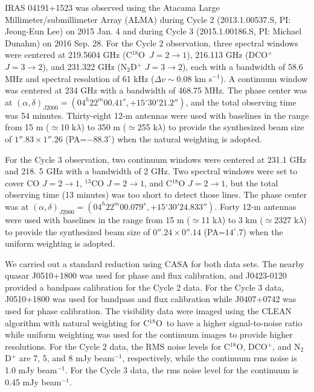 \documentclass{nature}
\newcommand{\jj}[2]{\mbox{$J = #1\rightarrow#2$}}
\newcommand{\cooo}{\mbox{C$^{18}$O}}
\newcommand{\degree}{\mbox{$^\circ$}}
\begin{document}


IRAS 04191+1523 was observed using the Atacama Large Millimeter/submillimeter Array (ALMA) 
during  Cycle 2  (2013.1.00537.S, PI: Jeong-Eun Lee) on 2015 Jan. 4 
and during Cycle 3 (2015.1.00186.S, PI: Michael Dunahm) on 2016 Sep. 28.
For the Cycle 2 observation, three spectral windows were centered  at 219.5604 GHz (\cooo\ \jj21), 
216.113 GHz (DCO$^+$ \jj32), and 231.322 GHz (N$_2$D$^+$ \jj32), 
each with a bandwidth of 58.6 MHz and spectral resolution of 61 kHz ($ \Delta v \sim$0.08 km s$^{-1}$). 
A continuum window was centered at  234 GHz with a bandwidth of 468.75 MHz.
The phase center was at $(\alpha, \delta)_{J2000}=(04^{h}22^{m}00.41^{s}, +15\degree30'21.2'')$, 
and the total observing time was 54 minutes. 
Thirty-eight 12-m antennas were used with baselines in the range from 15 m ($\simeq$10 k$\lambda$) 
to 350 m ($\simeq$255 k$\lambda$) to provide the synthesized beam size of $1''.83 \times 1''.26$ (PA=$-88.3^{\circ}$)
when the natural weighting is adopted.

For the Cycle 3 observation, two continuum windows were centered at 231.1 GHz and 218. 5 GHz with a bandwidth of 2 GHz.
Two spectral windows were set to cover CO \jj21, $^{13}$CO \jj21, and C$^{18}$O \jj21, 
but the total observing time (13 minutes) was too short to detect those lines.
The phase center was at $(\alpha, \delta)_{J2000}=(04^{h}22^{m}00.079^{s}, +15\degree30'24.833'')$.
Forty 12-m antennas were used with baselines in the range from 15 m ($\simeq$11 k$\lambda$) to 3 km ($\simeq$2327 k$\lambda$)
to provide the synthesized beam size of $0''.24 \times 0''.14$ (PA=$14^{\circ}.7$) when the uniform weighting is adopted.

We carried out a standard reduction using CASA\cite{McMullin2007} for both data sets.
The nearby quasar J0510+1800 was used for phase and flux calibration, and J0423-0120 provided a bandpass calibration 
for the Cycle 2 data.
For the Cycle 3 data, J0510+1800 was used for bandpass and flux calibration while J0407+0742 was used for phase calibration. 
The visibility data were imaged using the CLEAN algorithm with natural weighting for \cooo\ to have a higher signal-to-noise ratio 
while uniform weighting was used for the continuum images to provide higher resolutions.
For the Cycle 2 data, the RMS noise levels for C$^{18}$O, DCO$^+$, and N$_2$D$^+$ are 7, 5, and 8 mJy beam$^{-1}$, respectively, 
while the continuum rms noise is 1.0 mJy beam$^{-1}$.
For the Cycle 3 data, the rms noise level for the continuum is 0.45 mJy beam$^{-1}$.
\end{document}
